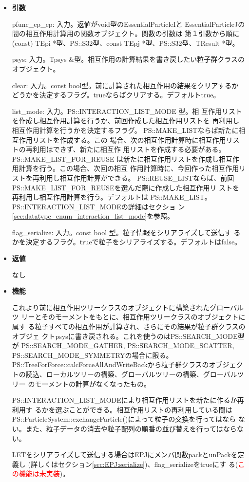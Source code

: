 \begin{itemize}

\item {\bf 引数}

pfunc\_ep\_ep: 入力。返値がvoid型のEssentialParticleIと
EssentialParticleJの間の相互作用計算用の関数オブジェクト。関数の引数は
第１引数から順に(const) TEpi *型、PS::S32型、const
TEpj *型、PS::S32型、TResult *型。

psys: 入力。Tpsys \&型。相互作用の計算結果を書き戻したい粒子群クラスの
オブジェクト。

clear: 入力。const bool型。前に計算された相互作用の結果をクリアするか
どうかを決定するフラグ。trueならばクリアする。デフォルトtrue。

list\_mode: 入力。PS::INTERACTION\_LIST\_MODE 型。相
互作用リストを作成し相互作用計算を行うか、前回作成した相互作用リストを
再利用し相互作用計算を行うかを決定するフラグ。
PS::MAKE\_LISTならば新たに相互作用リストを作成する。この
場合、次の相互作用計算時に相互作用リストの再利用はできず、新たに相互作
用リストを作成する必要がある。PS::MAKE\_LIST\_FOR\_REUSE
は新たに相互作用リストを作成し相互作用計算を行う。この場合、次回の相互
作用計算時に、今回作った相互作用リストを再利用し相互作用計算ができる。
PS::REUSE\_LISTならば、前回
PS::MAKE\_LIST\_FOR\_REUSEを選んだ際に作成した相互作用リ
ストを再利用し相互作用計算を行う。デフォルトは
PS::MAKE\_LIST。PS::INTERACTION\_LIST\_MODEの詳細はセクショ
ン\ref{sec:datatype_enum_interaction_list_mode}を参照。

flag\_serialize: 入力。const bool 型。粒子情報をシリアライズして送信す
るかを決定するフラグ。trueで粒子をシリアライズする。デフォルトはfalse。

\item {\bf 返値}

なし

\item {\bf 機能}

これより前に相互作用ツリークラスのオブジェクトに構築されたグローバルツ
リーとそのモーメントをもとに、相互作用ツリークラスのオブジェクトに属す
る粒子すべての相互作用が計算され、さらにその結果が粒子群クラスのオブジェ
クトpsysに書き戻される。これを使うのはPS::SEARCH\_MODE型が
PS::SEARCH\_MODE\_GATHER, PS::SEARCH\_MODE\_SCATTER,
PS::SEARCH\_MODE\_SYMMETRYの場合に限る。
PS::TreeForForce::calcForceAllAndWriteBackから粒子群クラスのオブジェク
トの読込、ローカルツリーの構築、グローバルツリーの構築、グローバルツリー
のモーメントの計算がなくなったもの。

PS::INTERACTION\_LIST\_MODEにより相互作用リストを新たに作るか再利用す
るかを選ぶことができる。相互作用リストの再利用している間は
PS::ParticleSystem::exchangeParticle()によって粒子の交換を行ってはなら
ない。また、粒子データの消去や粒子配列の順番の並び替えを行ってはならな
い。

LETをシリアライズして送信する場合はEPJにメンバ関数packとunPackを定義し
(詳しくはセクション\ref{sec:EPJ:serialize})、flag\_serializeをtrueにす
る(\textcolor{red}{この機能は未実装})。

\end{itemize}

